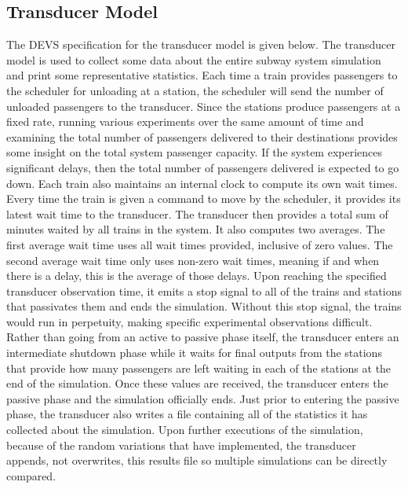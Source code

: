 \subsection{Transducer Model}
The DEVS specification for the transducer model is given below.  The transducer model is used to collect some data about the entire subway system simulation and print some representative statistics. Each time a train provides passengers to the scheduler for unloading at a station, the scheduler will send the number of unloaded passengers to the transducer.  Since the stations produce passengers at a fixed rate, running various experiments over the same amount of time and examining the total number of passengers delivered to their destinations provides some insight on the total system passenger capacity.  If the system experiences significant delays, then the total number of passengers delivered is expected to go down.  Each train also maintains an internal clock to compute its own wait times. Every time the train is given a command to move by the scheduler, it provides its latest wait time to the transducer.  The transducer then provides a total sum of minutes waited by all trains in the system.  It also computes two averages.  The first average wait time uses all wait times provided, inclusive of zero values.  The second average wait time only uses non-zero wait times, meaning if and when there is a delay, this is the average of those delays.  Upon reaching the specified transducer observation time, it emits a stop signal to all of the trains and stations that passivates them and ends the simulation.  Without this stop signal, the trains would run in perpetuity, making specific experimental observations difficult. Rather than going from an active to passive phase itself, the transducer enters an intermediate shutdown phase while it waits for final outputs from the stations that provide how many passengers are left waiting in each of the stations at the end of the simulation.  Once these values are received, the transducer enters the passive phase and the simulation officially ends.  Just prior to entering the passive phase, the transducer also writes a file containing all of the statistics it has collected about the simulation.  Upon further executions of the simulation, because of the random variations that have implemented, the transducer appends, not overwrites, this results file so multiple simulations can be directly compared.
